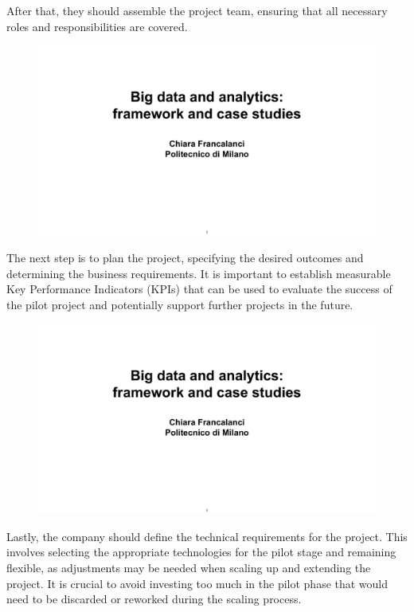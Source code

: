 After that, they should assemble the project team, ensuring that all
necessary roles and responsibilities are covered.

\begin{figure}[!h]
  \centering
  \includegraphics[page=87, trim = 1cm 1.5cm 1.5cm 3cm, clip, width=\imagewidth]{images/06 - BIG_DATA.pdf}
\end{figure}

The next step is to plan the project, specifying the desired outcomes
and determining the business requirements. It is important to establish
measurable Key Performance Indicators (KPIs) that can be used to
evaluate the success of the pilot project and potentially support
further projects in the future.

\begin{figure}[!h]
  \centering
  \includegraphics[page=88, trim = 0cm 3cm 1.5cm 4.5cm, clip, width=\imagewidth]{images/06 - BIG_DATA.pdf}
\end{figure}

Lastly, the company should define the technical requirements for the
project. This involves selecting the appropriate technologies for the
pilot stage and remaining flexible, as adjustments may be needed when
scaling up and extending the project. It is crucial to avoid investing
too much in the pilot phase that would need to be discarded or reworked
during the scaling process.

